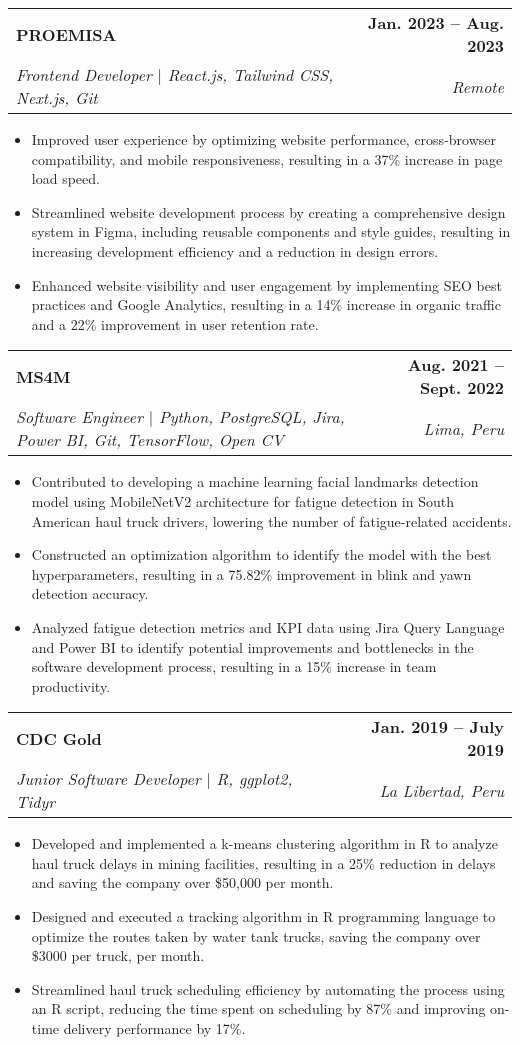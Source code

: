 \documentclass[letterpaper,11pt]{article}
\makeatletter
\newcommand{\resumeItem}[1]{
  \item\small{
    {#1 \vspace{-2pt}}
  }
}
\newcommand{\resumeSubheading}[4]{
  \vspace{-2pt}\item
    \begin{tabular*}{1.0\textwidth}[t]{l@{\extracolsep{\fill}}r}
      \textbf{#1} & \textbf{\small #2} \\
      \textit{\small#3} & \textit{\small #4} \\
    \end{tabular*}\vspace{-7pt}
}
\newcommand{\resumeItemListStart}{\begin{itemize}}
\newcommand{\resumeItemListEnd}{\end{itemize}\vspace{-5pt}}
\makeatother
\begin{document}
  \resumeSubheading
  {PROEMISA}{Jan. 2023 -- Aug. 2023}
  {Frontend Developer $|$ React.js, Tailwind CSS, Next.js, Git}{Remote}
  \resumeItemListStart
    \resumeItem{Improved user experience by optimizing website performance, cross-browser compatibility, and mobile responsiveness, resulting in a 37\% increase in page load speed.}
    \resumeItem{Streamlined website development process by creating a comprehensive design system in Figma, including reusable components and style guides, resulting in increasing development efficiency and a reduction in design errors.}
    \resumeItem{Enhanced website visibility and user engagement by implementing SEO best practices and Google Analytics, resulting in a 14\% increase in organic traffic and a 22\% improvement in user retention rate.}
  \resumeItemListEnd

  \resumeSubheading
    {MS4M}{Aug. 2021 -- Sept. 2022}
    {Software Engineer $|$ Python, PostgreSQL, Jira, Power BI, Git, TensorFlow, Open CV}{Lima, Peru}
    \resumeItemListStart
      \resumeItem{Contributed to developing a machine learning facial landmarks detection model using MobileNetV2 architecture for fatigue detection in South American haul truck drivers, lowering the number of fatigue-related accidents.}
      \resumeItem{Constructed an optimization algorithm to identify the model with the best hyperparameters, resulting in a 75.82\% improvement in blink and yawn detection accuracy.}
      \resumeItem{Analyzed fatigue detection metrics and KPI data using Jira Query Language and Power BI to identify potential improvements and bottlenecks in the software development process, resulting in a 15\% increase in team productivity.}
    \resumeItemListEnd

  \resumeSubheading
    {CDC Gold}{Jan. 2019 -- July 2019}
    {Junior Software Developer $|$ R, ggplot2, Tidyr}{La Libertad, Peru}
    \resumeItemListStart
      \resumeItem{Developed and implemented a k-means clustering algorithm in R to analyze haul truck delays in mining facilities, resulting in a 25\% reduction in delays and saving the company over \$50,000 per month.}
      \resumeItem{Designed and executed a tracking algorithm in R programming language to optimize the routes taken by water tank trucks, saving the company over \$3000 per truck, per month.}
      \resumeItem{Streamlined haul truck scheduling efficiency by automating the process using an R script, reducing the time spent on scheduling by 87\% and improving on-time delivery performance by 17\%.}
  \resumeItemListEnd
    
\end{document}
